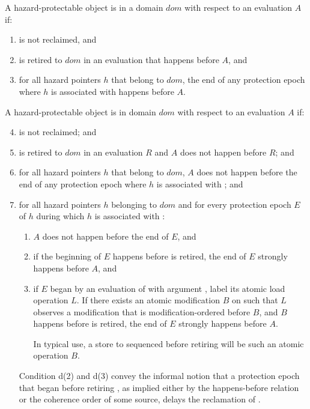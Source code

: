 A hazard-protectable object  is  in a domain $dom$ with respect to
an evaluation $A$ if:
\begin{enumerate}
\item {} is not reclaimed, and
\item {} is retired to $dom$ in an evaluation that happens before $A$, and
\item for all hazard pointers $h$ that belong to $dom$, the end of any protection epoch where $h$ is associated with  happens before $A$.
\end{enumerate}

A hazard-protectable object  is  in domain $dom$ with respect to an
evaluation $A$ if:
\begin{enumerate}
\setcounter{enumi}{3}
\item {} is not reclaimed; and
\item {} is retired to $dom$ in an evaluation $R$ and $A$ does not happen before $R$; and
\item for all hazard pointers $h$ that belong to $dom$, $A$ does not happen before the end of
any protection epoch where $h$ is associated with ; and
\item for all hazard pointers $h$ belonging to $dom$ and for every protection epoch $E$ of $h$
during which $h$ is associated with :
\begin{enumerate}
  \item $A$ does not happen before the end of $E$, and
  \item if the beginning of $E$ happens before  is retired, the end of $E$ strongly
happens before $A$, and
  \item if $E$ began by an evaluation of  with argument , label its
atomic load operation $L$. If there exists an atomic modification $B$ on  such that $L$ observes a modification that is modification-ordered before $B$, and $B$ happens before  is retired, the end of $E$ strongly happens before $A$. \begin{note} In typical use, a store to  sequenced before retiring  will be such an atomic operation $B$.\end{note}
\end{enumerate}
\begin{note} Condition d(2) and d(3) convey the informal notion that a protection epoch that began before retiring , as implied either by the happens-before relation or the coherence order of some source, delays the reclamation of .\end{note}
\end{enumerate}

